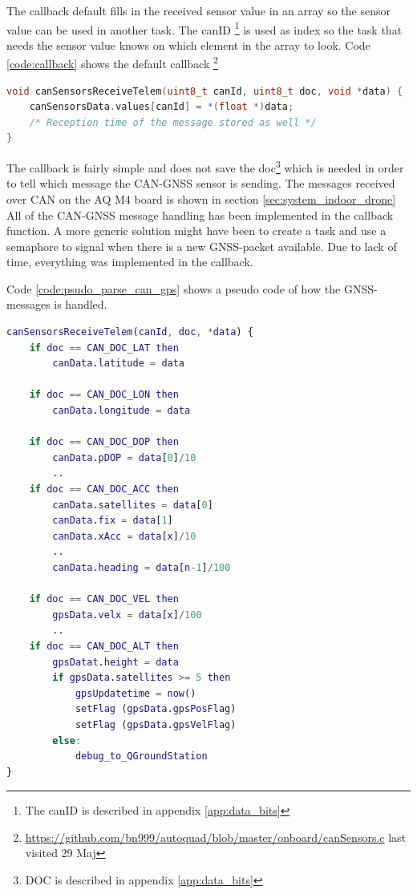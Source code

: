 The callback default fills in the received sensor value in an array so the sensor value can be used in another task.
The canID \footnote{The canID is described in appendix \ref{app:data_bits}} is used as index so the task that needs the sensor value knows on which element in the array to look. Code \ref{code:callback} shows the default callback \footnote{\url{https://github.com/bn999/autoquad/blob/master/onboard/canSensors.c} last visited 29 Maj}
\begin{lstlisting}[language = c, caption = Callback invoked when a CAN-sensorvalue is received. It stores the value in an array indexed by canId. Note that the sensor value is casted to a float, label=code:callback]
void canSensorsReceiveTelem(uint8_t canId, uint8_t doc, void *data) {
    canSensorsData.values[canId] = *(float *)data;
	/* Reception time of the message stored as well */
}
\end{lstlisting}
The callback is fairly simple and does not save the doc\footnote{DOC is described in appendix \ref{app:data_bits}} which is needed in order to tell which message the CAN-GNSS sensor is sending. The messages received over CAN on the AQ M4 board is shown in section \ref{sec:system_indoor_drone}\\

All of the CAN-GNSS message handling has been implemented in the callback function. A more generic solution might have been to create a task and use a semaphore to signal when there is a new GNSS-packet available. Due to lack of time, everything was implemented in the callback.

Code \ref{code:psudo_parse_can_gps} shows a pseudo code of how the GNSS-messages is handled.

\begin{lstlisting}[language = Matlab, caption = Modified callback invoked when a sensor-value is received. Shows how DOC is used to tell which GNSS-message is received and when height is received the flags are set to update the \ac{UKF}, label=code:psudo_parse_can_gps]
canSensorsReceiveTelem(canId, doc, *data) {
	if doc == CAN_DOC_LAT then
		canData.latitude = data
		
	if doc == CAN_DOC_LON then
		canData.longitude = data
		
	if doc == CAN_DOC_DOP then
		canData.pDOP = data[0]/10
		..
	if doc == CAN_DOC_ACC then
		canData.satellites = data[0]
		canData.fix = data[1]
		canData.xAcc = data[x]/10
		..
		canData.heading = data[n-1]/100
		
	if doc == CAN_DOC_VEL then
		gpsData.velx = data[x]/100
		..		
	if doc == CAN_DOC_ALT then
		gpsDatat.height = data
		if gpsData.satellites >= 5 then
			gpsUpdatetime = now()
			setFlag (gpsData.gpsPosFlag)
			setFlag (gpsData.gpsVelFlag)
		else:
			debug_to_QGroundStation
}
\end{lstlisting}

